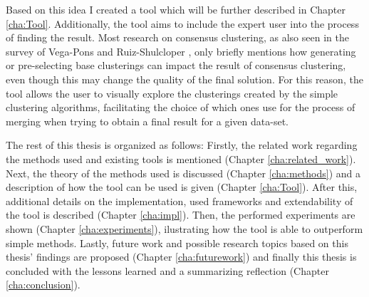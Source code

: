 Based on this idea I created a tool which will be further described in Chapter \ref{cha:Tool}. Additionally, the tool aims to include the expert user into the process of finding the result. Most research on consensus clustering, as also seen in the survey of Vega-Pons and Ruiz-Shulcloper \cite{survey1}, only briefly mentions how generating or pre-selecting base clusterings can impact the result of consensus clustering, even though this may change the quality of the final solution. For this reason, the tool allows the user to visually explore the clusterings created by the simple clustering algorithms, facilitating the choice of which ones use for the process of merging when trying to obtain a final result for a given data-set.

The rest of this thesis is organized as follows: Firstly, the related work regarding the methods used and existing tools is mentioned (Chapter \ref{cha:related_work}). Next, the theory of the methods used is discussed (Chapter \ref{cha:methods}) and a description of how the tool can be used is given (Chapter \ref{cha:Tool}). After this, additional details on the implementation, used frameworks and extendability of the tool is described (Chapter \ref{cha:impl}). Then, the performed experiments are shown (Chapter \ref{cha:experiments}), ilustrating how the tool is able to outperform simple methods. Lastly, future work and possible research topics based on this thesis' findings are proposed (Chapter \ref{cha:futurework}) and finally this thesis is concluded with the lessons learned and a summarizing reflection (Chapter \ref{cha:conclusion}).
